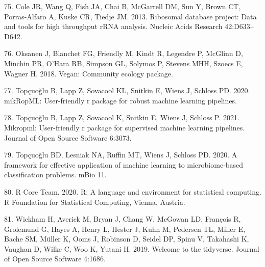\documentclass[
  11pt,
]{article}
\begin{document}
\leavevmode\hypertarget{ref-Cole2013}{}%
75. Cole JR, Wang Q, Fish JA, Chai B, McGarrell DM, Sun Y, Brown CT,
Porras-Alfaro A, Kuske CR, Tiedje JM. 2013. Ribosomal database project:
Data and tools for high throughput rRNA analysis. Nucleic Acids Research
42:D633--D642.

\leavevmode\hypertarget{ref-Vegan2018}{}%
76. Oksanen J, Blanchet FG, Friendly M, Kindt R, Legendre P, McGlinn D,
Minchin PR, O'Hara RB, Simpson GL, Solymos P, Stevens MHH, Szoecs E,
Wagner H. 2018. Vegan: Community ecology package.

\leavevmode\hypertarget{ref-mikropml}{}%
77. Topçuoğlu B, Lapp Z, Sovacool KL, Snitkin E, Wiens J, Schloss PD.
2020. mikRopML: User-friendly r package for robust machine learning
pipelines.

\leavevmode\hypertarget{ref-Topcuoglu2021}{}%
78. Topçuoğlu B, Lapp Z, Sovacool K, Snitkin E, Wiens J, Schloss P.
2021. Mikropml: User-friendly r package for supervised machine learning
pipelines. Journal of Open Source Software 6:3073.

\leavevmode\hypertarget{ref-Topcuoglu2020}{}%
79. Topçuoğlu BD, Lesniak NA, Ruffin MT, Wiens J, Schloss PD. 2020. A
framework for effective application of machine learning to
microbiome-based classification problems. mBio 11.

\leavevmode\hypertarget{ref-r_citation_2020}{}%
80. R Core Team. 2020. R: A language and environment for statistical
computing. R Foundation for Statistical Computing, Vienna, Austria.

\leavevmode\hypertarget{ref-Tidyverse2019}{}%
81. Wickham H, Averick M, Bryan J, Chang W, McGowan LD, François R,
Grolemund G, Hayes A, Henry L, Hester J, Kuhn M, Pedersen TL, Miller E,
Bache SM, Müller K, Ooms J, Robinson D, Seidel DP, Spinu V, Takahashi K,
Vaughan D, Wilke C, Woo K, Yutani H. 2019. Welcome to the tidyverse.
Journal of Open Source Software 4:1686.

\newpage
\end{document}
